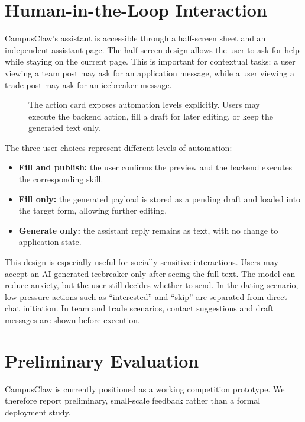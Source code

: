 \documentclass[twocolumn]{article}
\begin{document}
\section{Human-in-the-Loop Interaction}
CampusClaw's assistant is accessible through a half-screen sheet and an independent assistant page. The half-screen design allows the user to ask for help while staying on the current page. This is important for contextual tasks: a user viewing a team post may ask for an application message, while a user viewing a trade post may ask for an icebreaker message.

\begin{figure}[t]
\centering
{}
\caption{The action card exposes automation levels explicitly. Users may execute the backend action, fill a draft for later editing, or keep the generated text only.}
\label{fig:hitl}
\end{figure}

The three user choices represent different levels of automation:
\begin{itemize}
    \item \textbf{Fill and publish:} the user confirms the preview and the backend executes the corresponding skill.
    \item \textbf{Fill only:} the generated payload is stored as a pending draft and loaded into the target form, allowing further editing.
    \item \textbf{Generate only:} the assistant reply remains as text, with no change to application state.
\end{itemize}

This design is especially useful for socially sensitive interactions. Users may accept an AI-generated icebreaker only after seeing the full text. The model can reduce anxiety, but the user still decides whether to send. In the dating scenario, low-pressure actions such as ``interested'' and ``skip'' are separated from direct chat initiation. In team and trade scenarios, contact suggestions and draft messages are shown before execution.

\section{Preliminary Evaluation}
CampusClaw is currently positioned as a working competition prototype. We therefore report preliminary, small-scale feedback rather than a formal deployment study.
\end{document}
